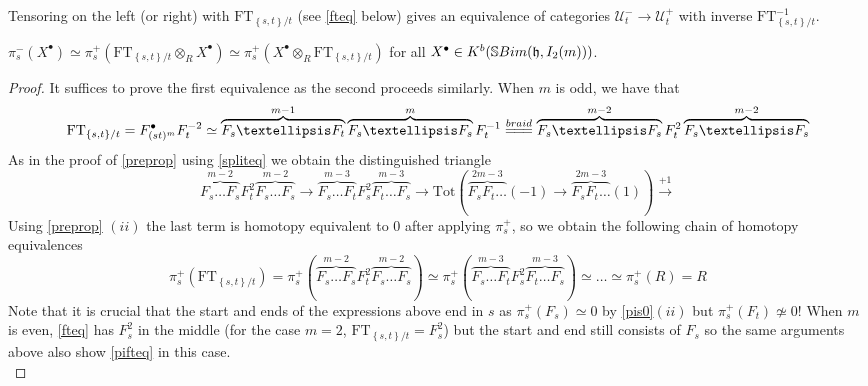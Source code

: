 \documentclass[10pt,a4paper]{amsart}
\newcommand{\Uc}{\mathcal{U}}
\newcommand{\ft}{\mathrm{FT}}
\newcommand{\hf}{\mathfrak{h}}
\newcommand{\paren}[1]{\left( #1 \right)}
\newcommand{\sbim}{\mathbb{S}\textnormal{Bim}}
\newcommand{\set}[1]{\left \{ #1 \right \}}
\newcommand{\xequals}[1]{\overset{#1}{=\joinrel=\joinrel=}}
\begin{document}
\begin{lemma}
\label{tenequiv}
   Tensoring on the left (or right) with $\ft_{\set{s,t}/t}$ (see \cref{fteq} below) gives an equivalence of categories $\Uc_t^{-}\to \Uc_t^{+}$ with inverse $\ft_{\set{s,t}/t}^{-1}$. 
\end{lemma}

\begin{theorem}
\label{relsertheorem}
    $\pi_s^-(X^\bullet)\simeq \pi_s^+( \ft_{\set{s,t}/t}\otimes_R X^\bullet )\simeq \pi_s^+(X^\bullet\otimes_R \ft_{\set{s,t}/t} )$ for all $X^\bullet\in K^b(\sbim(\hf, I_2(m)))$.
\end{theorem}

\begin{proof}
It suffices to prove the first equivalence as the second proceeds similarly. When $m$ is odd, we have that 
   \begin{equation}
   \label{fteq}
       \ft_{\set{s,t}/t}=F^\bullet_{(st)^m}F_t^{-2}\simeq\overbrace{F_s\ldots F_t}^{m-1}\overbrace{F_s\ldots F_s}^{m} F_t^{-1}\xequals{braid}  \overbrace{F_s\ldots F_s}^{m-2}F_t^2\overbrace{F_s\ldots F_s}^{m-2}  
   \end{equation} 
   As in the proof of \cref{preprop} using \cref{spliteq} we obtain the distinguished triangle
   \[ \overbrace{F_s\ldots F_s}^{m-2 }F_t^2\overbrace{F_s\ldots F_s}^{m-2 }\to \overbrace{F_s\ldots F_t}^{m -3}F_s^2\overbrace{F_t\ldots F_s}^{m -3}\to  \mathrm{Tot}\paren{\overbrace{F_sF_t\ldots}^{2m-3}(-1)\to\overbrace{F_sF_t\ldots}^{2m-3 }(1) } \xrightarrow{+1}\]
   Using \cref{preprop} $(ii)$ the last term is homotopy equivalent to 0 after applying $\pi_s^+$, so we obtain the following chain of homotopy equivalences
   \begin{equation}
   \label{pifteq}
    \pi_s^+\paren{  \ft_{\set{s,t}/t}}=  \pi_s^+\paren{  \overbrace{F_s\ldots F_s}^{m-2 }F_t^2\overbrace{F_s\ldots F_s}^{m-2 }}\simeq \pi_s^+\paren{  \overbrace{F_s\ldots F_t}^{m-3 }F_s^2\overbrace{F_t\ldots F_s}^{m -3}}\simeq \ldots \simeq \pi_s^+\paren{R}=R  
   \end{equation} 
   Note that it is crucial that the start and ends of the expressions above end in $s$ as  $\pi_s^+(F_s)\simeq 0$ by \cref{pis0}$(ii)$ but $\pi_s^+(F_t)\not\simeq 0$! When $m$ is even, \cref{fteq} has $F_s^2$ in the middle (for the case $m=2$, $\ft_{\set{s,t}/t}=F_s^2$) but the start and end still consists of $F_s$ so the same arguments above also show \cref{pifteq} in this case. \\


\end{proof}
\end{document}
